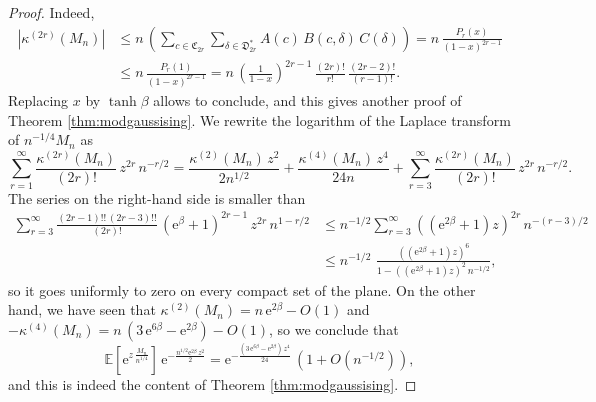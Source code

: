 \documentclass[12pt,a4paper,reqno]{amsart}
\newcommand{\E}{\mathrm{e}}
\newcommand{\esper}{\mathbb{E}}
\newcommand{\cym}{\mathfrak{C}}
\newcommand{\dym}{\mathfrak{D}}
\theoremstyle{remark}
\begin{document}
\begin{proof}
Indeed,
\begin{align*}
|\kappa^{(2r)}(M_n)| &\leq n \, \left(\sum_{c \in \cym_{2r}} \sum_{\delta \in \dym_{2r}^*} A(c)\,B(c,\delta)\,C(\delta)\right) = n\,\frac{P_r(x)}{(1-x)^{2r-1}} \\
&\leq n\,\frac{P_r(1)}{(1-x)^{2r-1}} = n\,\left(\frac{1}{1-x}\right)^{2r-1}\,\frac{(2r)!}{r!}\,\frac{(2r-2)!}{(r-1)!}. 
\end{align*}
Replacing $x$ by $\tanh \beta$ allows to conclude, and this gives another proof of Theorem \ref{thm:modgaussising}. We rewrite the logarithm of the Laplace transform of $n^{-1/4}M_n$ as
$$\sum_{r=1}^\infty \frac{\kappa^{(2r)}(M_n)}{(2r)!}\,z^{2r}\,n^{-r/2} = \frac{\kappa^{(2)}(M_n)\,z^2}{2n^{1/2}}+\frac{\kappa^{(4)}(M_n)\,z^4}{24n}+\sum_{r=3}^\infty \frac{\kappa^{(2r)}(M_n)}{(2r)!}\,z^{2r}\,n^{-r/2}.$$
The series on the right-hand side is smaller than
\begin{align*}\sum_{r=3}^\infty \frac{(2r-1)!!\,(2r-3)!!}{(2r)!} \, (\E^\beta+1)^{2r-1}\,z^{2r}\,n^{1-r/2} &\leq n^{-1/2}\sum_{r=3}^\infty ((\E^{2\beta} + 1)z)^{2r} \,n^{-(r-3)/2}\\
&\leq n^{-1/2}\,\,\frac{((\E^{2\beta} + 1)z)^{6}}{1-((\E^{2\beta} + 1)z)^{2}\,n^{-1/2}},
\end{align*}
so it goes uniformly to zero on every compact set of the plane. On the other hand, we have seen that $\kappa^{(2)}(M_n)=n\,\E^{2\beta} - O(1)$ and $-\kappa^{(4)}(M_n)=n\,(3\,\E^{6\beta}-\E^{2\beta}) - O(1)$, so we conclude that
$$\esper\!\left[\E^{z\,\frac{M_n}{n^{1/4}}}\right]\,\E^{-\frac{n^{1/2}\E^{2\beta}\,z^2}{2}}=\E^{-\frac{(3\,\E^{6\beta}-\E^{2\beta})\,z^4}{24}}\,\left(1+O(n^{-1/2})\right),$$
and this is indeed the content of Theorem \ref{thm:modgaussising}.
\end{proof}




\end{document}
